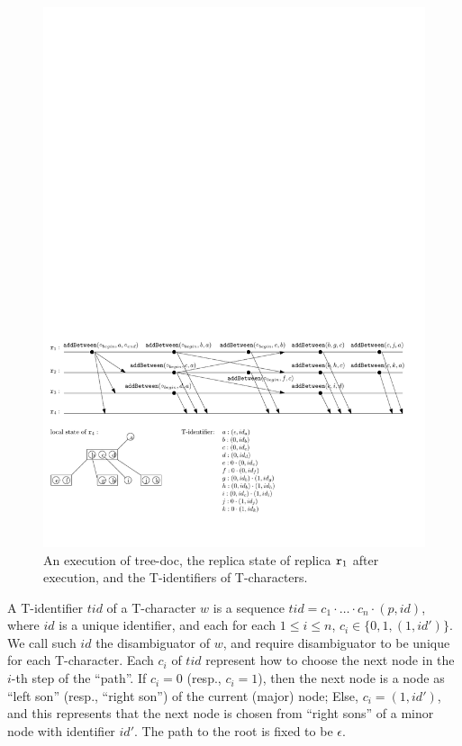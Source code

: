 \begin{figure}[!h]
  \centering
  \includegraphics[width=0.85 \textwidth]{figures/TreeDocExecutionandLocalState.pdf}
\vspace{-10pt}
  \caption{An execution of tree-doc, the replica state of replica $\mathtt{r}_1$ after execution, and the T-identifiers of T-characters.}
  \label{fig:an execution of tree-doc, the local state of replica r1 after execution, and the T-identifiers of T-characters}
\end{figure}


A T-identifier $tid$ of a T-character $w$ is a sequence $tid = c_1 \cdot \ldots \cdot c_n \cdot (p,id)$, where $id$ is a unique identifier, and each for each $1 \leq i \leq n$, $c_i \in \{ 0,1,(1,id')\}$. We call such $id$ the disambiguator of $w$, and require disambiguator to be unique for each T-character. Each $c_i$ of $tid$ represent how to choose the next node in the $i$-th step of the ``path''. If $c_i=0$ (resp., $c_i=1$), then the next node is a node as ``left son'' (resp., ``right son'') of the current (major) node; Else, $c_i = (1,id')$, and this represents that the next node is chosen from ``right sons'' of a minor node with identifier $id'$. The path to the root is fixed to be $\epsilon$.

